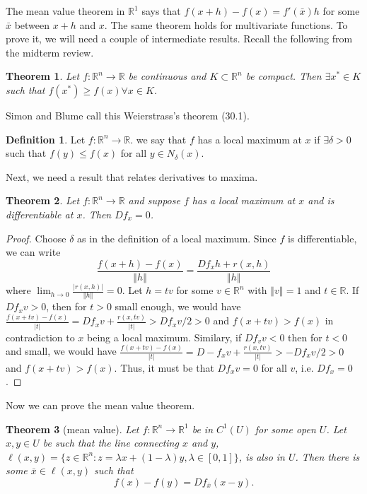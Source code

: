 \documentclass[12pt,reqno]{amsart}
\newtheorem{theorem}{Theorem}[section]
\theoremstyle{definition}
\newtheorem{definition}{Definition}[section]
\def\R{\mathbb{R}}
\newcommand{\norm}[1]{\left\Vert {#1} \right\Vert}
\renewcommand{\to}{{\rightarrow}}
\begin{document}
The mean value theorem in $\R^1$ says that $f(x+h) - f(x) =
f'(\bar{x}) h$ for some $\bar{x}$ between $x+h$ and $x$. The same
theorem holds for multivariate functions. To prove it, we will need a
couple of intermediate results. Recall the following from the midterm
review. 
\begin{theorem}
  Let $f:\R^n \to \R$ be continuous and $K \subset \R^n$ be
  compact. Then $\exists x^* \in K$ such that $f(x^*) \geq f(x)
  \forall x \in K$. 
\end{theorem}
Simon and Blume call this Weierstrass's theorem (30.1). 
\begin{definition}
  Let $f: \R^n \to \R$. we say that $f$ has a local maximum at $x$ if
  $\exists \delta > 0$ such that $f(y) \leq f(x)$ for all $y \in
  N_\delta(x)$. 
\end{definition}
Next, we need a result that relates derivatives to maxima. 
\begin{theorem}\label{thm:localmax}
  Let $f: \R^n \to \R$ and suppose $f$ has a local maximum at $x$ and
  is differentiable at $x$. Then $Df_x = 0$. 
\end{theorem}
\begin{proof}
  Choose $\delta$ as in the definition of a local maximum. Since $f$
  is differentiable, we can write
  \[ \frac{f(x+h) - f(x)}{\norm{h}} =\frac{ Df_x h +
    r(x,h)}{\norm{h}} \] where $\lim_{h \to 0}
  \frac{|r(x,h)|}{\norm{h}} = 0$. Let $h = t v$ for some $v \in \R^n$
  with $\norm{v} =1$ and $t \in \R$. If $D f_x v > 0$, then for $t>0$
  small enough, we would have $\frac{f(x+tv) - f(x)}{|t|} = D
  f_x v + \frac{r(x,tv)}{|t|} > D
  f_x v / 2 > 0$ and $f(x+tv)> f(x)$ in contradiction to $x$ being a
  local maximum. Similary, if $D f_v v < 0$ then for $t<0$ and small,
  we would have $\frac{f(x+tv) - f(x)}{|t|} = D
  -f_x v + \frac{r(x,tv)}{|t|} > -D
  f_x v / 2 > 0$ and $f(x+tv)> f(x)$. Thus, it must be that $D f_x v =
  0$ for all $v$, i.e. $D f_x = 0$. 
\end{proof}
Now we can prove the mean value theorem.
\begin{theorem}[mean value]\label{thm:mvt}
  Let $f:\R^n \to \R^1$ be in $C^1(U)$ for some open $U$. Let $x, y
  \in U$ be such that the line connecting $x$ and $y$, $\ell(x,y) =
  \{z\in \R^n: z = \lambda x + (1-\lambda) y, \lambda \in [0,1]\}$, is
  also in $U$. Then there is some $\bar{x} \in \ell(x,y)$ such that
  \[ f(x) - f(y) = Df_{\bar{x}} (x-y). \]
\end{theorem}
\end{document}
